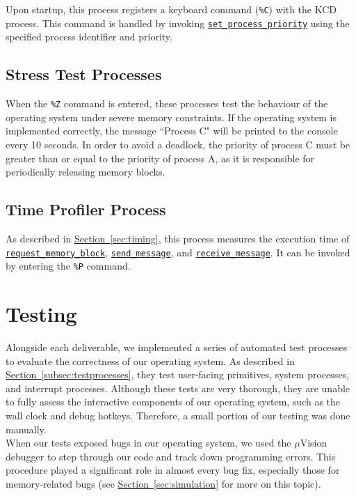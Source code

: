 \documentclass[12pt]{report}
\begin{document}
Upon startup, this process registers a keyboard command (\texttt{\%C}) with the KCD process. This command is handled by invoking \hyperref[alg:processpriority]{\texttt{set_process_priority}} using the specified process identifier and priority.

\subsection{Stress Test Processes}

When the \texttt{\%Z} command is entered, these processes test the behaviour of the operating system under severe memory constraints. If the operating system is implemented correctly, the message ``Process C" will be printed to the console every 10 seconds. In order to avoid a deadlock, the priority of process C must be greater than or equal to the priority of process A, as it is responsible for periodically releasing memory blocks.

\subsection{Time Profiler Process}

As described in \hyperref[sec:timing]{Section~\ref*{sec:timing}}, this process measures the execution time of \hyperref[alg:requestingmemoryblocks]{\texttt{request_memory_block}}, \hyperref[alg:sendingmessages]{\texttt{send_message}}, and \hyperref[alg:receivingmessages]{\texttt{receive_message}}. It can be invoked by entering the \texttt{\%P} command.

\section{Testing}

Alongside each deliverable, we implemented a series of automated test processes to evaluate the correctness of our operating system. As described in \hyperref[subsec:testprocesses]{Section~\ref*{subsec:testprocesses}}, they test user-facing primitives, system processes, and interrupt processes. Although these tests are very thorough, they are unable to fully assess the interactive components of our operating system, such as the wall clock and debug hotkeys. Therefore, a small portion of our testing was done manually.\\

When our tests exposed bugs in our operating system, we used the $\mu$Vision debugger to step through our code and track down programming errors. This procedure played a significant role in almost every bug fix, especially those for memory-related bugs (see \hyperref[sec:simulation]{Section~\ref*{sec:simulation}} for more on this topic).
\end{document}
